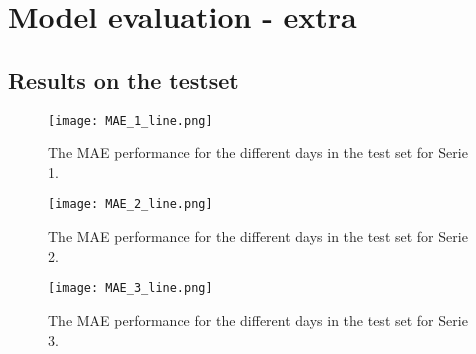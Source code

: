 \chapter{Model evaluation - extra}
\label{app:Extensions on the evaluation results}

\section{Results on the testset}

\begin{figure}[h]
	\centering
	\texttt{[image: MAE\_1\_line.png]}
	\caption{The MAE performance for the different days in the test set for Serie 1.}
	\label{fig:MAE_line_serie1}
\end{figure}

\begin{figure}[h]
	\centering
	\texttt{[image: MAE\_2\_line.png]}
	\caption{The MAE performance for the different days in the test set for Serie 2.}
	\label{fig:MAE_line_serie2}
\end{figure}	

\begin{figure}[h]
	\centering
	\texttt{[image: MAE\_3\_line.png]}
	\caption{The MAE performance for the different days in the test set for Serie 3.}
	\label{fig:MAE_line_serie3}
\end{figure}












